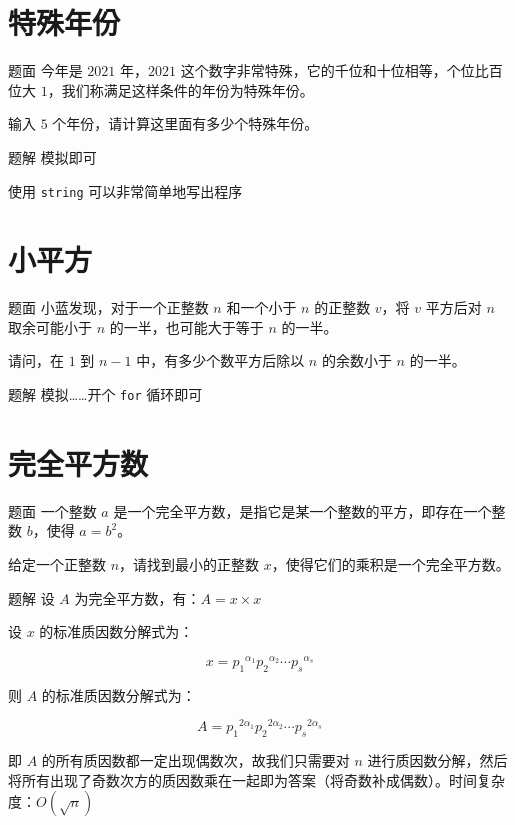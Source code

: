 \documentclass{pptt}
\begin{document}
\section{特殊年份}

\begin{frame}{题面}
    今年是 $2021$ 年，$2021$ 这个数字非常特殊，它的千位和十位相等，个位比百位大 $1$，我们称满足这样条件的年份为特殊年份。

    输入 $5$ 个年份，请计算这里面有多少个特殊年份。
\end{frame}

\begin{frame}{题解}
    模拟即可

    使用 \texttt{string} 可以非常简单地写出程序
\end{frame}

\section{小平方}

\begin{frame}{题面}
    小蓝发现，对于一个正整数 $n$ 和一个小于 $n$ 的正整数 $v$，将 $v$ 平方后对 $n$ 取余可能小于 $n$ 的一半，也可能大于等于 $n$ 的一半。

    请问，在 $1$ 到 $n-1$ 中，有多少个数平方后除以 $n$ 的余数小于 $n$ 的一半。
\end{frame}

\begin{frame}{题解}
    模拟……开个 \texttt{for} 循环即可
\end{frame}

\section{完全平方数}

\begin{frame}{题面}
    一个整数 $a$ 是一个完全平方数，是指它是某一个整数的平方，即存在一个整数 $b$，使得 $a=b^2$。

    给定一个正整数 $n$，请找到最小的正整数 $x$，使得它们的乘积是一个完全平方数。
\end{frame}

\begin{frame}{题解}
    设 $A$ 为完全平方数，有：$A=x \times x$

    设 $x$ 的标准质因数分解式为：

    $$x={p_1}^{\alpha_1}{p_2}^{\alpha_2} \cdots {p_s}^{\alpha_s}$$

    则 $A$ 的标准质因数分解式为：

    $$A={p_1}^{2\alpha_1}{p_2}^{2\alpha_2} \cdots {p_s}^{2\alpha_s}$$

    即 $A$ 的所有质因数都一定出现偶数次，故我们只需要对 $n$ 进行质因数分解，然后将所有出现了奇数次方的质因数乘在一起即为答案（将奇数补成偶数）。时间复杂度：$O(\sqrt{n})$
\end{frame}
\end{document}
